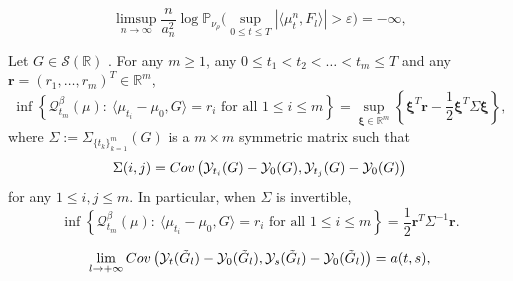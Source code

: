 \documentclass[10pt,a4paper]{amsart}
\newcommand{\Pbb}{\mathbb{P}}
\newcommand{\R}{\mathbb{R}}
\newcommand{\Scal}{\mathcal{S}}
\begin{document}
 \begin{equation}\label{exp tight error}
\limsup_{n \rightarrow \infty} \frac{n}{a_n^2} \log \Pbb_{\nu_\rho} \Big( \sup_{0 \leq t \leq T} |\langle \mu^n_t,F_l\rangle | >  \varepsilon \Big) = -\infty,
\end{equation}

\begin{lemma}\label{lemma 5.1}
Let $G\in \Scal(\R)$ . For any $m \geq 1$,  any $0 \leq t_1 < t_2 < \ldots < t_m \leq T$ and any $\mathbf{r}=(r_1,\ldots, r_m)^T\in \mathbb{R}^m$,
\[		\inf\left\{\mathcal{Q}^\beta_{t_m} (\mu):~ \langle \mu_{t_i} - \mu_{0}, G \rangle=r_i\text{~for all~}1\leq i\leq m\right\}
=\sup_{\bm{\xi} \in \R^m}\left\{\bm{\xi}^T \mathbf{r}-\frac{1}{2}\bm{\xi}^T \Sigma \bm{\xi}\right\},\]
	where $\Sigma := \Sigma_{\{t_k\}_{k=1}^m}(G)$ is a $m\times m$ symmetric matrix such that
	\[
	\Sigma (i,j)={\rm Cov}\left(\mathcal{Y}_{t_i}(G)-\mathcal{Y}_{0}(G), \mathcal{Y}_{t_j}(G)-\mathcal{Y}_{0}(G)\right)
	\]
	for any $1\leq i,j\leq m$. In particular, when $\Sigma$ is invertible, 
	\[
\inf\left\{\mathcal{Q}^\beta_{t_m} (\mu):~ \langle \mu_{t_i} - \mu_{0}, G \rangle=r_i\text{~for all~}1\leq i\leq m\right\}=\frac{1}{2} \mathbf{r}^T\Sigma^{-1} \mathbf{r} .
	\]
\end{lemma}

\begin{equation}\label{cov converg}
\lim_{l\rightarrow+\infty}{\rm Cov}\left(\mathcal{Y}_t(\tilde{G}_l)-\mathcal{Y}_0(\tilde{G}_l), \mathcal{Y}_s(\tilde{G}_l)-\mathcal{Y}_0(\tilde{G}_l)\right) = a(t,s),
\end{equation}
\end{document}
